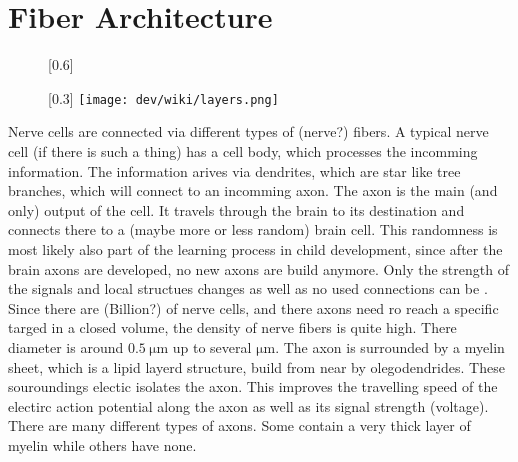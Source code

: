 \section{Fiber Architecture} \label{sec:fiberArchitecture}
% 
\begin{figure}[!t]
\centering
% 
\hspace*{\fill}
\tikzset{external/export next=false}
[0.6\textwidth]{
}
\hspace*{\fill}
[0.3\textwidth]{
\texttt{[image: dev/wiki/layers.png]}
}
\hspace*{\fill}
% 
\caption[GM, WM, layers]{}
\label{fig:BBrain}
\end{figure}
% 
Nerve cells are connected via different types of (nerve?) fibers.
A typical nerve cell (if there is such a thing) has a cell body, which processes the incomming information.
The information arives via dendrites, which are star like tree branches, which will connect to an incomming axon.
The axon is the main (and only) output of the cell.
It travels through the brain to its destination and connects there to a (maybe more or less random) brain cell.
This randomness is most likely also part of the learning process in child development, since after the brain axons are developed, no new axons are build anymore.
Only the strength of the signals and local structues changes as well as no used connections can be .
Since there are (Billion?) of nerve cells, and there axons need ro reach a specific targed in a closed volume, the density of nerve fibers is quite high.
There diameter is around $\SI{0.5}{\micro\meter}$ up to several $\si{\micro\meter}$.
The axon is surrounded by a myelin sheet, which is a lipid layerd structure, build from near by olegodendrides.
These souroundings electic isolates the axon.
This improves the travelling speed of the electirc action potential along the axon as well as its signal strength (voltage).
There are many different types of axons.
Some contain a very thick layer of myelin while others have none.
